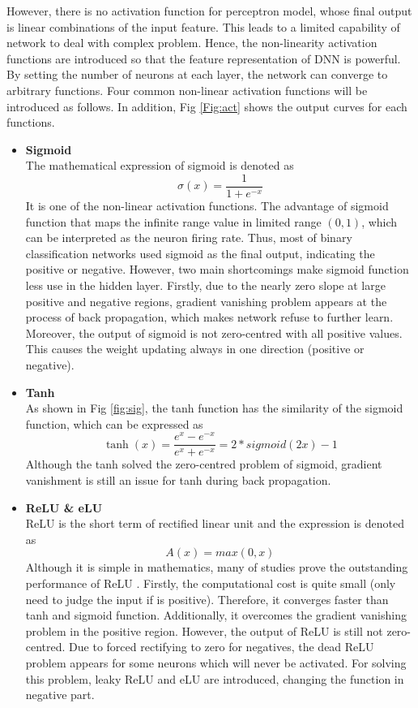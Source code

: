 However, there is no activation function for perceptron model, whose final output is linear combinations of the input feature. This leads to a limited capability of network to deal with complex problem. Hence, the non-linearity activation functions are introduced so that the feature representation of DNN is powerful. By setting the number of neurons at each layer, the network can converge to arbitrary functions. Four common non-linear activation functions will be introduced as follows. In addition, Fig \ref{Fig:act} shows the output curves for each functions.
\begin{itemize}[leftmargin=*]
	\item \textbf{Sigmoid}\\
	The mathematical expression of sigmoid is denoted as
	\begin{equation}
		\sigma(x)=\frac{1}{1+e^{-x}}
	\end{equation}
	It is one of the non-linear activation functions. The advantage of sigmoid function that maps the infinite range value in limited range $(0, 1)$, which can be interpreted as the neuron firing rate. Thus, most of binary classification networks used sigmoid as the final output, indicating the positive or negative. However, two main shortcomings make sigmoid function less use in the hidden layer. Firstly, due to the nearly zero slope at large positive and negative regions, gradient vanishing problem appears at the process of back propagation, which makes network refuse to further learn. Moreover, the output of sigmoid is not zero-centred with all positive values. This causes the weight updating always in one direction (positive or negative). 
	\item \textbf{Tanh}\\
	As shown in Fig \ref{fig:sig}, the tanh function has the similarity of the sigmoid function, which can be expressed as
	\begin{equation}
		\tanh(x)=\frac{e^{x}-e^{-x}}{e^{x}+e^{-x}}=2*sigmoid(2x)-1
	\end{equation}
	Although the tanh solved the zero-centred problem of sigmoid, gradient vanishment is still an issue for tanh during back propagation.
	\item \textbf{ReLU \& eLU}\\
	ReLU is the short term of rectified linear unit and the expression is denoted as
	\begin{equation}
	A(x) = max(0,x)	
	\end{equation}
	Although it is simple in mathematics, many of studies prove the outstanding performance of ReLU \cite{maas2013rectifier}. Firstly, the computational cost is quite small (only need to judge the input if is positive). Therefore, it converges faster than tanh and sigmoid function. Additionally, it overcomes the gradient vanishing problem in the positive region. However, the output of ReLU is still not zero-centred. Due to forced rectifying to zero for negatives, the dead ReLU problem appears for some neurons which will never be activated. For solving this problem, leaky ReLU and eLU are introduced, changing the function in negative part.\\

\end{itemize}
